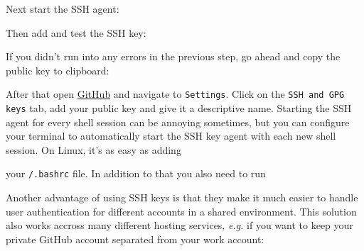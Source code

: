 \begin{flushleft}
\end{flushleft}

\begin{flushleft}
	Next start the SSH agent:
\end{flushleft}

\begin{flushleft}
\end{flushleft}

\begin{flushleft}
	Then add and test the SSH key:
\end{flushleft}

\begin{flushleft}
\end{flushleft}

\begin{flushleft}
\end{flushleft}

\begin{flushleft}
	If you didn't run into any errors in the previous step, go ahead and copy the public key to clipboard:
\end{flushleft}

\begin{flushleft}
\end{flushleft}

\begin{flushleft}
	After that open \href{https://github.com/}{GitHub} and navigate to \texttt{Settings}.
	Click on the \texttt{SSH and GPG keys} tab, add your public key and give
	it a descriptive name. Starting the SSH agent for every shell session can be
	annoying sometimes, but you can configure your terminal to automatically start
	the SSH key agent with each new shell session. On Linux, it's as easy as adding
\end{flushleft}

\begin{flushleft}
\end{flushleft}

\begin{flushleft}
	your \texttt{\home/.bashrc} file. In addition to that you also need to run
\end{flushleft}

\begin{flushleft}
\end{flushleft}

\begin{flushleft}
	Another advantage of using SSH keys is that they make it much easier to handle
	user authentication for different accounts in a shared environment. This solution
	also works accross many different hosting services, \textit{e.g.} if you want to
	keep your private GitHub account separated from your work account:
	\textcolor{gray}{{\small}}
\end{flushleft}
